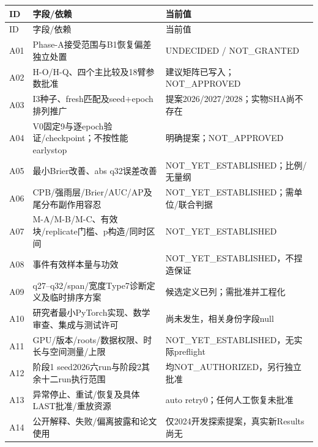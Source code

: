 \documentclass[UTF8,fontset=fandol,10pt]{ctexart}
\begin{document}
\begingroup\small\setlength{\tabcolsep}{3pt}\renewcommand{\arraystretch}{1.12}
\begin{longtable}{>{\raggedright\arraybackslash}p{\dimexpr(\linewidth-6\tabcolsep)/3\relax}>{\raggedright\arraybackslash}p{\dimexpr(\linewidth-6\tabcolsep)/3\relax}>{\raggedright\arraybackslash}p{\dimexpr(\linewidth-6\tabcolsep)/3\relax}}
\toprule
ID & 字段/\allowbreak{}依赖 & 当前值 \\
\midrule\endfirsthead
ID & 字段/\allowbreak{}依赖 & 当前值 \\
\midrule\endhead
A01 & Phase-A接受范围与B1恢复偏差独立处置 & UNDECIDED /\allowbreak{} NOT\_\allowbreak{}GRANTED \\
A02 & H-O/\allowbreak{}H-Q、四个主比较及18臂参数批准 & 建议矩阵已写入；NOT\_\allowbreak{}APPROVED \\
A03 & I3种子、fresh匹配及seed+epoch排列推广 & 提案2026/\allowbreak{}2027/\allowbreak{}2028；实物SHA尚不存在 \\
A04 & V0固定9与逐epoch验证/\allowbreak{}checkpoint；不按性能earlystop & 明确提案；NOT\_\allowbreak{}APPROVED \\
A05 & 最小Brier改善、abs q32误差改善 & NOT\_\allowbreak{}YET\_\allowbreak{}ESTABLISHED；比例/\allowbreak{}无量纲 \\
A06 & CPB/\allowbreak{}强雨层/\allowbreak{}Brier/\allowbreak{}AUC/\allowbreak{}AP及尾分布副作用容忍 & NOT\_\allowbreak{}YET\_\allowbreak{}ESTABLISHED；需单位/\allowbreak{}联合判据 \\
A07 & M-A/\allowbreak{}M-B/\allowbreak{}M-C、有效块/\allowbreak{}replicate门槛、p构造/\allowbreak{}同时区间 & NOT\_\allowbreak{}YET\_\allowbreak{}ESTABLISHED \\
A08 & 事件有效样本量与功效 & NOT\_\allowbreak{}YET\_\allowbreak{}ESTABLISHED，不捏造保证 \\
A09 & q27–q32/\allowbreak{}span/\allowbreak{}宽度Type7诊断定义及临时排序方案 & 候选定义已列；需批准并工程化 \\
A10 & 研究者最小PyTorch实现、数学审查、集成与测试许可 & 尚未发生，相关身份字段null \\
A11 & GPU/\allowbreak{}版本/\allowbreak{}roots/\allowbreak{}数据权限、时长与空间测量/\allowbreak{}上限 & NOT\_\allowbreak{}YET\_\allowbreak{}ESTABLISHED，无实际preflight \\
A12 & 阶段1 seed2026六run与阶段2其余十二run执行范围 & 均NOT\_\allowbreak{}AUTHORIZED，另行独立批准 \\
A13 & 异常停止、重试/\allowbreak{}恢复及具体LAST批准/\allowbreak{}重放资源 & auto retry0；任何人工恢复未批准 \\
A14 & 公开解释、失败/\allowbreak{}偏离披露和论文使用 & 仅2024开发探索提案，真实新Results尚无 \\
\bottomrule\end{longtable}\endgroup
\end{document}
